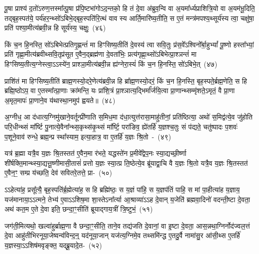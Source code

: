 पू॒षा प्राश्य॑ द॒तो॑\-ऽरुण॒त्तस्मा᳚त्पू॒षा प्र॑पि॒ष्टभा॑गो\-ऽद॒न्तको॒ हि तं दे॒वा अ॑ब्रुव॒न्वि वा अ॒यमा᳚र्ध्यप्राशित्रि॒यो वा अ॒यम॑भू॒दिति॒ तद्बृह॒स्पत॑ये॒ पर्य॑हर॒न्थ्सो॑\-ऽबिभे॒द्बृह॒स्पति॑रि॒त्थं वाव स्य आर्ति॒\-मारि॑\-ष्य॒\-तीति॒ स ए॒तं मन्त्र॑मपश्य॒थ्सूर्य॑स्य त्वा॒ चक्षु॑षा॒ प्रति॑ पश्या॒मीत्य॑ब्रवी॒न्न हि सूर्य॑स्य॒ चक्षुः॒~(४६)\ip

किं च॒न हि॒नस्ति॒ सो॑\-ऽबिभेत्प्रतिगृ॒ह्णन्तं॑ मा हिꣳसिष्य॒तीति॑ दे॒वस्य॑ त्वा सवि॒तुः प्र॑स॒वे᳚\-ऽश्विनो᳚र्बा॒हु\-भ्यां᳚ पू॒ष्णो हस्ता᳚भ्यां॒ प्रति॑ गृह्णा॒मीत्य॑ब्रवीथ्सवि॒तृप्र॑सूत ए॒वैन॒द्ब्रह्म॑णा दे॒वता॑भिः॒ प्रत्य॑\-गृह्णा॒थ्सो॑\-ऽबिभेत्प्रा॒श्ञन्तं॑ मा हिꣳसिष्य॒तीत्य॒ग्नेस्त्वा॒\-ऽऽ\-\-स्ये॑न॒ प्राश्ञा॒मीत्य॑ब्रवी॒न्न ह्य॑ग्नेरा॒स्यं॑ किं च॒न हि॒नस्ति॒ सो॑\-ऽबिभे॒त्~(४७)\ip

प्राशि॑तं मा हिꣳसिष्य॒तीति॑ ब्राह्म॒णस्यो॒दरे॒णेत्य॑ब्रवी॒न्न हि ब्रा᳚ह्म॒णस्यो॒दरं॒ किं च॒न हि॒नस्ति॒ बृह॒स्पते॒र्ब्रह्म॒णेति॒ स हि ब्रह्मि॒ष्ठो\-ऽप॒ वा ए॒तस्मा᳚त्प्रा॒णाः क्रा॑मन्ति॒ यः प्रा॑शि॒त्रं प्रा॒श्ञात्य॒द्भिर्मा᳚र्जयि॒त्वा प्रा॒णान्थ्सम्मृ॑शते॒\-ऽमृतं॒ वै प्रा॒णा अ॒मृत॒मापः॑ प्रा॒णाने॒व य॑थास्था॒नमुप॑ ह्वयते॥~(४८)\ip

{\anuvakamend[{प्रा॒श्ञी॒याद्धोता॑ य॒ज्ञं निर॑हर॒न्तच्चक्षु॑रा॒स्य॑ङ्किं च॒न हि॒नस्ति॒ सो॑\-ऽबिभे॒च्चतु॑श्चत्वारिꣳशच्च}]}

अ॒ग्नीध॒ आ द॑धात्य॒ग्निमु॑खाने॒वर्तून्प्री॑णाति स॒मिध॒मा द॑धा॒त्युत्त॑रासा॒माहु॑तीनां॒ प्रति॑ष्ठित्या॒ अथो॑ स॒मिद्व॑त्ये॒व जु॑होति परि॒धीन्थ्सं मा᳚र्ष्टि पु॒नात्ये॒वैना᳚न्थ्स॒कृथ्स॑कृ॒थ्सं मा᳚र्ष्टि॒ परा॑ङिव॒ ह्ये॑तर्\mbox{}हि॑ य॒ज्ञश्च॒तुः सं प॑द्यते॒ चतु॑ष्पादः प॒शवः॑ प॒शूने॒वाव॑ रुन्धे॒ ब्रह्म॒न्प्र स्था᳚स्याम॒ इत्या॒हात्र॒ वा ए॒तर्\mbox{}हि॑ य॒ज्ञः श्रि॒तो~-~(४९)\ip

यत्र॑ ब्र॒ह्मा यत्रै॒व य॒ज्ञः श्रि॒तस्तत॑ ए॒वैन॒मा र॑भते॒ यद्धस्ते॑न प्र॒मीवे᳚द्वेप॒नः स्या॒द्यच्छी॒र्ष्णा शी॑र्\mbox{}षक्ति॒मान्थ्स्या॒द्यत्तू॒ष्णीमासी॒तासं॑ प्रत्तो य॒ज्ञः स्या॒त्प्र ति॒ष्ठेत्ये॒व ब्रू॑याद्वा॒चि वै य॒ज्ञः श्रि॒तो यत्रै॒व य॒ज्ञः श्रि॒तस्तत॑ ए॒वैन॒ꣳ॒ सम्प्र य॑च्छति॒ देव॑ सवितरे॒तत्ते॒ प्रा-~(५०)\ip

ऽऽहेत्या॑ह॒ प्रसू᳚त्यै॒ बृह॒स्पति॑र्ब्र॒ह्मेत्या॑ह॒ स हि ब्रह्मि॑ष्ठः॒ स य॒ज्ञं पा॑हि॒ स य॒ज्ञप॑तिं पाहि॒ स मां पा॒हीत्या॑ह य॒ज्ञाय॒ यज॑मानाया॒\-ऽऽ\-त्मने॒ तेभ्य॑ ए॒वा\-ऽऽ\-शिष॒मा शा॒स्ते\-ऽना᳚र्त्या आ॒श्राव्या॑\-ऽऽ\-ह दे॒वान् य॒जेति॑ ब्रह्मवा॒दिनो॑ वदन्ती॒ष्टा दे॒वता॒ अथ॑ कत॒म ए॒ते दे॒वा इति॒ छन्दा॒ꣳ॒सीति॑ ब्रूयाद्गाय॒त्रीं त्रि॒ष्टुभं॒~(५१)\ip

जग॑ती॒मित्यथो॒ खल्वा॑हुर्ब्राह्म॒णा वै छन्दा॒ꣳ॒सीति॒ ताने॒व तद्य॑जति दे॒वानां॒ वा इ॒ष्टा दे॒वता॒ आस॒न्नथा॒ग्निर्नोद॑ज्वल॒त्तं दे॒वा आहु॑तीभिरनूया॒जेष्वन्व॑विन्द॒न्॒ यद॑नूया॒जान् यज॑त्य॒ग्निमे॒व तथ्समि॑न्द्ध ए॒तदु॒र्वै नामा॑सु॒र आ॑सी॒थ्स ए॒तर्\mbox{}हि॑ य॒ज्ञस्या॒\-ऽऽ\-शिष॑मवृङ्क्त॒ यद्ब्रू॒यादे॒त-~(५२)\ip

